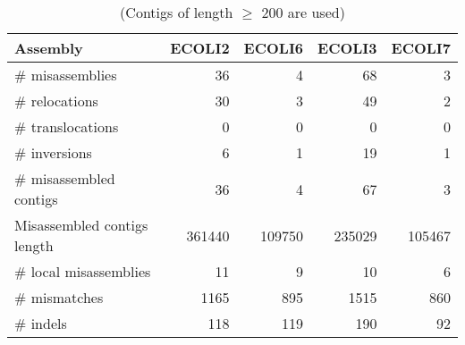 \begin{table}[ht]
\begin{center}
\caption{(Contigs of length $\geq$ 200 are used)}
\begin{tabular}{|l*{4}{|r}|}
\hline
Assembly & ECOLI2 & ECOLI6 & ECOLI3 & ECOLI7 \\ \hline
\# misassemblies & 36 & 4 & 68 & 3 \\ \hline
    \# relocations & 30 & 3 & 49 & 2 \\ \hline
    \# translocations & 0 & 0 & 0 & 0 \\ \hline
    \# inversions & 6 & 1 & 19 & 1 \\ \hline
\# misassembled contigs & 36 & 4 & 67 & 3 \\ \hline
Misassembled contigs length & 361440 & 109750 & 235029 & 105467 \\ \hline
\# local misassemblies & 11 & 9 & 10 & 6 \\ \hline
\# mismatches & 1165 & 895 & 1515 & 860 \\ \hline
\# indels & 118 & 119 & 190 & 92 \\ \hline
\end{tabular}
\end{center}
\end{table}
